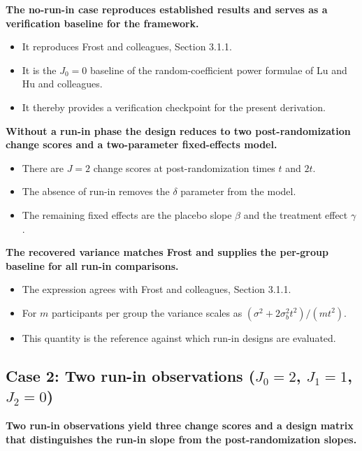 \documentclass[
  11pt,
]{article}
\begin{document}
\textbf{The no-run-in case reproduces established results and serves as a verification baseline for the framework.}

\begin{itemize}\setlength{\itemsep}{2pt}\setlength{\parskip}{0pt}
\item It reproduces Frost and colleagues, Section 3.1.1.
\item It is the $J_0 = 0$ baseline of the random-coefficient power formulae of Lu and Hu and colleagues.
\item It thereby provides a verification checkpoint for the present derivation.
\end{itemize}

\textbf{Without a run-in phase the design reduces to two post-randomization change scores and a two-parameter fixed-effects model.}

\begin{itemize}\setlength{\itemsep}{2pt}\setlength{\parskip}{0pt}
\item There are $J = 2$ change scores at post-randomization times $t$ and $2t$.
\item The absence of run-in removes the $\delta$ parameter from the model.
\item The remaining fixed effects are the placebo slope $\beta$ and the treatment effect $\gamma$.
\end{itemize}

\textbf{The recovered variance matches Frost and supplies the per-group baseline for all run-in comparisons.}

\begin{itemize}\setlength{\itemsep}{2pt}\setlength{\parskip}{0pt}
\item The expression agrees with Frost and colleagues, Section 3.1.1.
\item For $m$ participants per group the variance scales as $(\sigma^2 + 2\sigma_b^2 t^2)/(m t^2)$.
\item This quantity is the reference against which run-in designs are evaluated.
\end{itemize}

\subsection{\texorpdfstring{Case 2: Two run-in observations (\(J_0=2\), \(J_1=1\), \(J_2=0\))}{Case 2: Two run-in observations (J\_0=2, J\_1=1, J\_2=0)}}\label{case-2-two-run-in-observations-j_02-j_11-j_20}

\textbf{Two run-in observations yield three change scores and a design matrix that distinguishes the run-in slope from the post-randomization slopes.}
\end{document}
